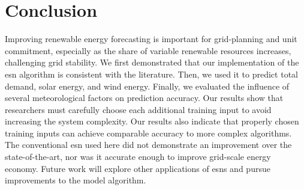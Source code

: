 \section{Conclusion}

Improving renewable energy forecasting is important for grid-planning
and unit commitment, especially as the share of variable renewable resources
increases, challenging grid stability. We first
demonstrated that our implementation of the \gls{esn} algorithm is consistent
with the literature. Then, we used it to predict
total demand, solar energy, and wind energy. Finally, we evaluated the
influence of several meteorological factors on prediction accuracy. Our results 
show that researchers must carefully choose each additional training input to
avoid increasing the system complexity. Our results also indicate that properly
chosen training inputs can achieve comparable accuracy to more complex
algorithms. The conventional \gls{esn} used here did not demonstrate an
improvement over the state-of-the-art, nor was it accurate enough to improve
grid-scale energy economy. Future work will explore other applications of
\glspl{esn} and pursue improvements to the model algorithm.
